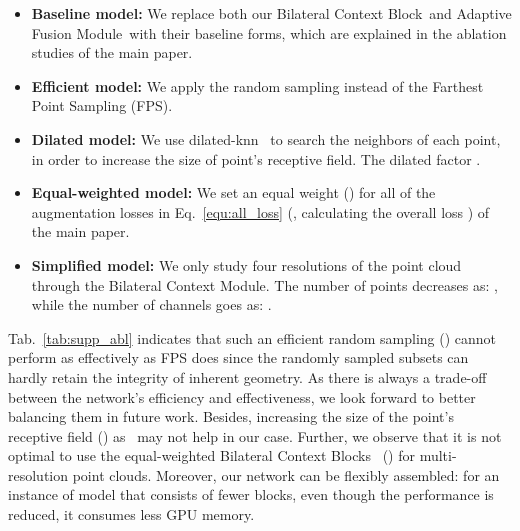 \documentclass[10pt,twocolumn,letterpaper]{article}
\def\ourencoder{Bilateral Context Module}
\def\ourblock{Bilateral Context Block}
\def\ourblocks{Bilateral Context Blocks}
\def\ourdecoder{Adaptive Fusion Module}
\begin{document}
\begin{itemize}
 \item \textbf{Baseline model:} We replace both our \ourblock~and \ourdecoder~with their baseline forms, which are explained in the ablation studies of the main paper.
 \item \textbf{Efficient model:} We apply the random sampling instead of the Farthest Point Sampling (FPS).
 \item \textbf{Dilated model:} We use dilated-knn~\cite{engelmann2020dilated} to search the neighbors of each point, in order to increase the size of point's receptive field. The dilated factor . 
 \item \textbf{Equal-weighted model:} We set an equal weight () for all of the augmentation losses in Eq.~\ref{equ:all_loss} (\ie, calculating the overall loss ) of the main paper.
 \item \textbf{Simplified model:} We only study four resolutions of the point cloud through the \ourencoder. The number of points decreases as: , while the number of channels goes as: . 
\end{itemize}

Tab.~\ref{tab:supp_abl} indicates that such an efficient random sampling () cannot perform as effectively as FPS does since the randomly sampled subsets can hardly retain the integrity of inherent geometry. As there is always a trade-off between the network's efficiency and effectiveness, we look forward to better balancing them in future work. Besides, increasing the size of the point's receptive field () as~\cite{engelmann2020dilated} may not help in our case. Further, we observe that it is not optimal to use the equal-weighted \ourblocks~ () for multi-resolution point clouds. Moreover, our network can be flexibly assembled: for an instance of model  that consists of fewer blocks, even though the performance is reduced, it consumes less GPU memory. 

\begin{table}
\begin{center}
\end{center}
\vspace{-2mm}
\caption{The general \emph{changes} () of neighborhoods by involving bilateral offsets.}
\label{tab:bilateral_behave}
\end{table}
\end{document}
